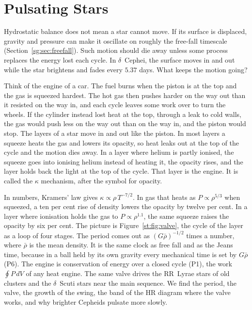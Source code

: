 \section{Pulsating Stars}
\label{st:sec:pulsation}

Hydrostatic balance does not mean a star cannot move. If its surface is displaced, gravity and pressure can make it oscillate on roughly the free-fall timescale (Section~\ref{sg:sec:freefall}). Such motion should die away unless some process replaces the energy lost each cycle. In $\delta$~Cephei, the surface moves in and out while the star brightens and fades every $5.37$ days. What keeps the motion going?

Think of the engine of a car. The fuel burns when the piston is at the top and the gas is squeezed hardest. The hot gas then pushes harder on the way out than it resisted on the way in, and each cycle leaves some work over to turn the wheels. If the cylinder instead lost heat at the top, through a leak to cold walls, the gas would push less on the way out than on the way in, and the piston would stop. The layers of a star move in and out like the piston. In most layers a squeeze heats the gas and lowers its opacity, so heat leaks out at the top of the cycle and the motion dies away. In a layer where helium is partly ionised, the squeeze goes into ionising helium instead of heating it, the opacity rises, and the layer holds back the light at the top of the cycle. That layer is the engine. It is called the $\kappa$ mechanism, after the symbol for opacity.

In numbers, Kramers' law gives $\kappa\propto\rho\,T^{-7/2}$. In gas that heats as $P\propto\rho^{5/3}$ when squeezed, a ten per cent rise of density lowers the opacity by twelve per cent. In a layer where ionisation holds the gas to $P\propto\rho^{1.1}$, the same squeeze raises the opacity by six per cent. The picture is Figure~\ref{st:fig:valve}, the cycle of the layer as a loop of four stages. The period comes out as $(G\bar\rho)^{-1/2}$ times a number, where $\bar\rho$ is the mean density. It is the same clock as free fall and as the Jeans time, because in a ball held by its own gravity every mechanical time is set by $G\bar\rho$ (P6). The engine is conservation of energy over a closed cycle (P1), the work $\oint P\,dV$ of any heat engine. The same valve drives the RR~Lyrae stars of old clusters and the $\delta$~Scuti stars near the main sequence. We find the period, the valve, the growth of the swing, the band of the HR diagram where the valve works, and why brighter Cepheids pulsate more slowly.

